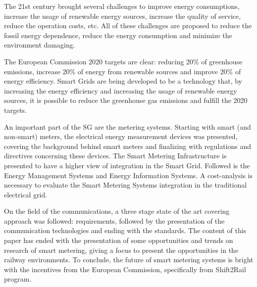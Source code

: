 The 21st century brought several challenges to improve energy consumptions, increase the usage of renewable energy sources, increase the quality of service, reduce the operation costs, etc. All of these challenges are proposed to reduce the fossil energy dependence, reduce the energy consumption and minimize the environment damaging.

The European Commission 2020 targets are clear: reducing 20\% of greenhouse emissions, increase 20\% of energy from renewable sources and improve 20\% of energy efficiency. Smart Grids are being developed to be a technology that, by increasing the energy efficiency and increasing the usage of renewable energy sources, it is possible to reduce the greenhouse gas emissions and fulfill the 2020 targets.

An important part of the SG are the metering systems. Starting with smart (and non-smart) meters, the electrical energy measurement devices was presented, covering the background behind smart meters and finalizing with regulations and directives concerning these devices.
The Smart Metering Infrastructure is presented to have a higher view of integration in the Smart Grid. Followed is the Energy Management Systems and Energy Information Systems. A cost-analysis is necessary to evaluate the Smart Metering Systems integration in the traditional electrical grid. 

On the field of the communications, a three stage  state of the art covering approach was followed: requirements, followed by the presentation of the communication technologies and ending with the standards. The content of this paper has ended with the presentation of some opportunities and trends on research of smart metering, giving a focus to present the opportunities in the railway environments.
To conclude, the future of smart metering systems is bright with the incentives from the European Commission, specifically from Shift2Rail program.
